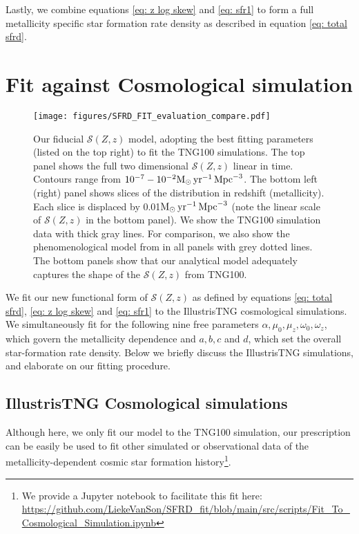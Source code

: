 \documentclass[linenumbers,twocolumn]{aastex631}
\newcommand{\Msun}{\ensuremath{\rm{M}_{\odot}}\xspace}
\newcommand{\yr}{\ensuremath{\,\rm{yr}}\xspace}
\newcommand{\Mpc}{\ensuremath{\,\rm{Mpc}}\xspace}
\newcommand{\SFRDzZ}{\ensuremath{\mathcal{S}(Z,z)}\xspace}
\begin{document}
Lastly, we combine equations \ref{eq: z log skew} and \ref{eq: sfr1} to form a full metallicity specific star formation rate density as described in equation \ref{eq: total sfrd}.


\section{Fit against Cosmological simulation \label{sec: fit against tng}}

\begin{figure*}
\centering
{}
\texttt{[image: figures/SFRD\_FIT\_evaluation\_compare.pdf]}
\caption{Our fiducial \SFRDzZ model, adopting the best fitting parameters (listed on the top right) to fit the TNG100 simulations. The top panel shows the full two dimensional \SFRDzZ linear in time. Contours range from $10^{-7} - 10^{-2} \Msun \yr^{-1}\Mpc^{-3}$. 
The bottom left (right) panel shows slices of the distribution in redshift (metallicity). Each slice is displaced by 0.01$\Msun \yr^{-1}\Mpc^{-3}$ (note the linear scale of \SFRDzZ in the bottom panel). We show the TNG100 simulation data with thick gray lines. 
For comparison, we also show the phenomenological model from \protect\cite{Neijssel+2019} in all panels with grey dotted lines. The bottom panels show that our analytical model adequately captures the shape of the \SFRDzZ from TNG100.
 \label{fig: fit SFRD}}
\end{figure*}
We fit our new functional form of \SFRDzZ as defined by equations \ref{eq: total sfrd}, \ref{eq: z log skew} and \ref{eq: sfr1} to the IllustrisTNG cosmological simulations. 
We simultaneously fit for the following nine free parameters $\alpha, \mu_0, \mu_z, \omega_0, \omega_z$, which govern the metallicity dependence and $a,b, c$ and $d$, which set the overall star-formation rate density.
Below we briefly discuss the IllustrisTNG simulations, and elaborate on our fitting procedure.




\subsection{IllustrisTNG Cosmological simulations}
Although here, we only fit our model to the TNG100 simulation, our prescription can be easily be used to fit other simulated or observational data of the metallicity-dependent cosmic star formation history\footnote{We provide a Jupyter notebook to facilitate this fit here: \url{https://github.com/LiekeVanSon/SFRD_fit/blob/main/src/scripts/Fit_To_Cosmological_Simulation.ipynb} }.
\end{document}
